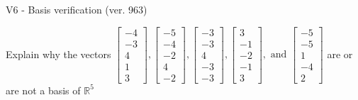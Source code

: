 \begin{exercise}
  \begin{exerciseTitle}V6 - Basis verification (ver. 963)\end{exerciseTitle}
  \begin{exerciseStatement}
    Explain why the vectors \(\left[\begin{array}{r}
-4 \\
-3 \\
4 \\
1 \\
3
\end{array}\right] , \left[\begin{array}{r}
-5 \\
-4 \\
-2 \\
4 \\
-2
\end{array}\right] , \left[\begin{array}{r}
-3 \\
-3 \\
4 \\
-3 \\
-3
\end{array}\right] , \left[\begin{array}{r}
3 \\
-1 \\
-2 \\
-1 \\
3
\end{array}\right] , \text{ and } \left[\begin{array}{r}
-5 \\
-5 \\
1 \\
-4 \\
2
\end{array}\right]\) are or are not a basis of \(\mathbb{R}^5\)	



\end{exerciseStatement}
\end{exercise}
